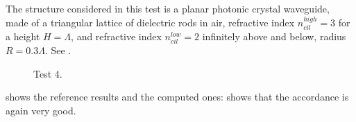 The structure considered in this test is a planar photonic crystal
waveguide, made of a triangular lattice of dielectric rods in air,
refractive index $n_{cil}^{high} = 3$ for a height $H = \Lambda$,
and refractive index $n_{cil}^{low} = 2$ infinitely above and below, radius
$R = 0.3 \Lambda$. See .

\begin{figure}[htbp]
  \begin{center}
  \end{center}
  \caption{Test 4.}
  \label{fig:test_4}
\end{figure}

 shows the reference results and
 the computed ones:  shows
that the accordance is again very good.

